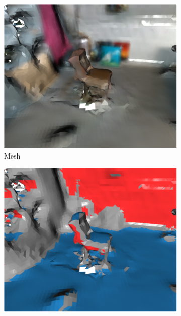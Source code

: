 \vspace{-12pt}
\begin{figure}[H]
\centering
  \begin{subfigure}[t]{.22\linewidth}
    \centering\includegraphics[clip,trim=0cm 0cm 0cm 0cm, width=.99\linewidth]{chapter_3_polylidar3d/imgs/meshes/planar_segment-region_a_v2.pdf}
    \caption{Mesh\label{fig:ch3_planar_seg_a}}\vspace{6pt}
  \end{subfigure}
  \hfill
  \begin{subfigure}[t]{.22\linewidth}
    \centering\includegraphics[clip,trim=0cm 0cm 0cm 0cm,width=.99\linewidth]{chapter_3_polylidar3d/imgs/meshes/planar_segment-region_b.pdf}

\end{subfigure}
\end{figure}
